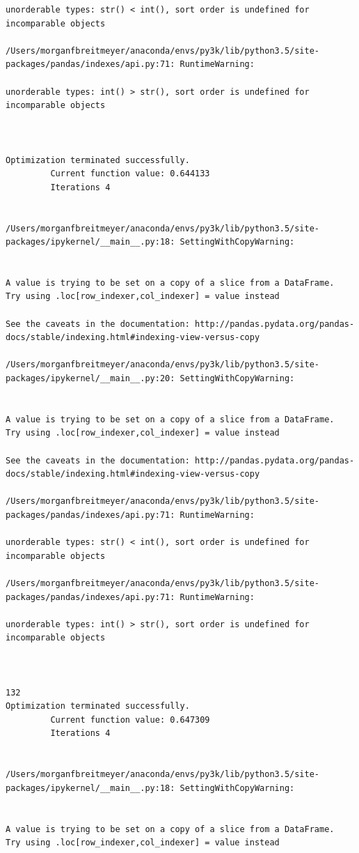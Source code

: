 \begin{lstlisting}
unorderable types: str() < int(), sort order is undefined for incomparable objects

/Users/morganfbreitmeyer/anaconda/envs/py3k/lib/python3.5/site-packages/pandas/indexes/api.py:71: RuntimeWarning:

unorderable types: int() > str(), sort order is undefined for incomparable objects



Optimization terminated successfully.
         Current function value: 0.644133
         Iterations 4


/Users/morganfbreitmeyer/anaconda/envs/py3k/lib/python3.5/site-packages/ipykernel/__main__.py:18: SettingWithCopyWarning:


A value is trying to be set on a copy of a slice from a DataFrame.
Try using .loc[row_indexer,col_indexer] = value instead

See the caveats in the documentation: http://pandas.pydata.org/pandas-docs/stable/indexing.html#indexing-view-versus-copy

/Users/morganfbreitmeyer/anaconda/envs/py3k/lib/python3.5/site-packages/ipykernel/__main__.py:20: SettingWithCopyWarning:


A value is trying to be set on a copy of a slice from a DataFrame.
Try using .loc[row_indexer,col_indexer] = value instead

See the caveats in the documentation: http://pandas.pydata.org/pandas-docs/stable/indexing.html#indexing-view-versus-copy

/Users/morganfbreitmeyer/anaconda/envs/py3k/lib/python3.5/site-packages/pandas/indexes/api.py:71: RuntimeWarning:

unorderable types: str() < int(), sort order is undefined for incomparable objects

/Users/morganfbreitmeyer/anaconda/envs/py3k/lib/python3.5/site-packages/pandas/indexes/api.py:71: RuntimeWarning:

unorderable types: int() > str(), sort order is undefined for incomparable objects



132
Optimization terminated successfully.
         Current function value: 0.647309
         Iterations 4


/Users/morganfbreitmeyer/anaconda/envs/py3k/lib/python3.5/site-packages/ipykernel/__main__.py:18: SettingWithCopyWarning:


A value is trying to be set on a copy of a slice from a DataFrame.
Try using .loc[row_indexer,col_indexer] = value instead


\end{lstlisting}
